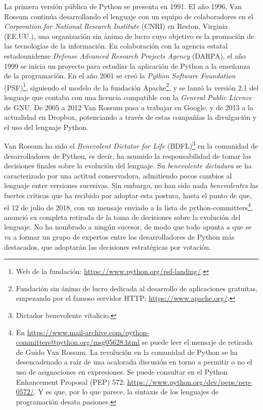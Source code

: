 La primera versión pública de Python se presenta en 1991. El año 1996, Van Rossum continúa desarrollando el lenguaje con un equipo de colaboradores en el \emph{Corporation for National Research Institute} (CNRI) en Reston, Virginia (EE.UU.), una organización sin ánimo de lucro cuyo objetivo es la promoción de las tecnologías de la información. En colaboración con la agencia estatal estadounidense \emph{Defense Advanced Research Projects Agency} (DARPA), el año 1999 se inicia un proyecto para estudiar la aplicación de Python a la enseñanza de la programación. En el año 2001 se creó la \emph{Python Software Foundation} (PSF)\footnote{Web de la fundación: \url{https://www.python.org/psf-landing/}.}, siguiendo el modelo de la fundación Apache\footnote{Fundación sin ánimo de lucro dedicada al desarrollo de aplicaciones gratuitas, empezando por el famoso servidor HTTP: \url{https://www.apache.org/}.}, y se lanzó la versión 2.1 del lenguaje que contaba con una licencia compatible con la \emph{General Public Licence} de GNU. De 2005 a 2012 Van Rossum pasa a trabajar en Google, y de 2013 a la actualidad en Dropbox, potenciando a través de estas compañías la divulgación y el uso del lenguaje Python.

Van Rossum ha sido el \emph{Benevolent Dictator for Life} (BDFL)\footnote{Dictador benevolente vitalicio.} en la comunidad de desarrolladores de Python, es decir, ha asumido la responsabilidad de tomar las decisiones finales sobre la evolución del lenguaje. Su \emph{benevolente dictadura} se ha caracterizado por una actitud conservadora, admitiendo pocos cambios al lenguaje entre versiones sucesivas. Sin embargo, no han sido nada \emph{benevolentes} las fuertes críticas que ha recibido por adoptar esta postura, hasta el punto de que, el 12 de julio de 2018, con un mensaje enviado a la lista de python-committers\footnote{En \url{https://www.mail-archive.com/python-committers@python.org/msg05628.html} se puede leer el mensaje de retirada de Guido Van Rossum. La revolución en la comunidad de Python se ha desencadenado a raíz de una acalorada discusión en torno a permitir o no el uso de asignaciones en expresiones. Se puede consultar en el Python Enhancement Proposal (PEP) 572: \url{https://www.python.org/dev/peps/pep-0572/}. Y es que, por lo que parece, la sintaxis de los lenguajes de programación desata pasiones.}, anunció su completa retirada de la toma de decisiones sobre la evolución del lenguaje. No ha nombrado a ningún sucesor, de modo que todo apunta a que se va a formar un grupo de expertos entre los desarrolladores de Python más destacados, que adoptarán las decisiones estratégicas por votación.



